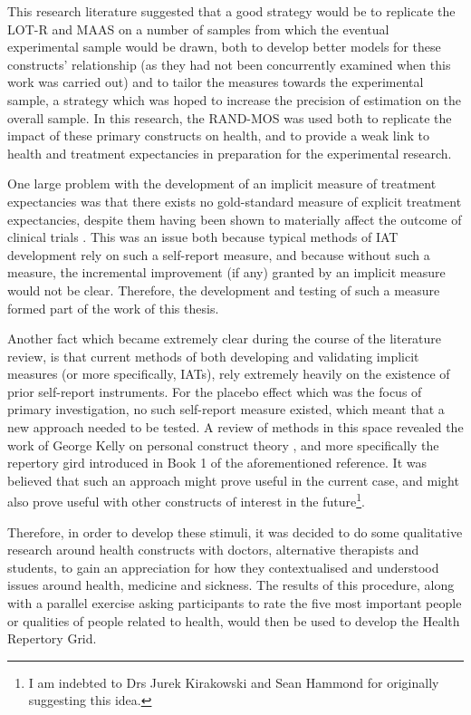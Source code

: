 This research literature suggested that a good strategy would be to
replicate the LOT-R and MAAS on a number of samples from which the
eventual experimental sample would be drawn, both to develop better
models for these constructs' relationship (as they had not been
concurrently examined when this work was carried out) and to tailor
the measures towards the experimental sample, a strategy which was
hoped to increase the precision of estimation on the overall sample.
In this research, the RAND-MOS was used both to replicate the impact
of these primary constructs on health, and to provide a weak link to
health and treatment expectancies in preparation for the experimental
research.

One large problem with the development of an implicit measure of
treatment expectancies was that there exists no gold-standard measure
of explicit treatment expectancies, despite them having been shown to
materially affect the outcome of clinical trials
\cite{Linde2007,Bausell2005,Benedetti2005}. This was an issue both
because typical methods of IAT development rely on such a self-report
measure, and because without such a measure, the incremental
improvement (if any) granted by an implicit measure would not be
clear. Therefore, the development and testing of such a measure formed
part of the work of this thesis.

Another fact which became extremely clear during the course of the
literature review, is that current methods of both developing and
validating implicit measures (or more specifically, IATs), rely
extremely heavily on the existence of prior self-report instruments.
For the placebo effect which was the focus of primary investigation,
no such self-report measure existed, which meant that a new approach
needed to be tested. A review of methods in this space revealed the
work of George Kelly on personal construct theory \cite{Kelly1991},
and more specifically the repertory gird introduced in Book 1 of the
aforementioned reference. It was believed that such an approach might
prove useful in the current case, and might also prove useful with
other constructs of interest in the future\footnote{I am indebted to
Drs Jurek Kirakowski and Sean Hammond for originally suggesting this
idea.}.

Therefore, in order to develop these stimuli, it was decided to do
some qualitative research around health constructs with doctors,
alternative therapists and students, to gain an appreciation for how
they contextualised and understood issues around health, medicine and
sickness. The results of this procedure, along with a parallel
exercise asking participants to rate the five most important people or
qualities of people related to health, would then be used to develop
the Health Repertory Grid.

